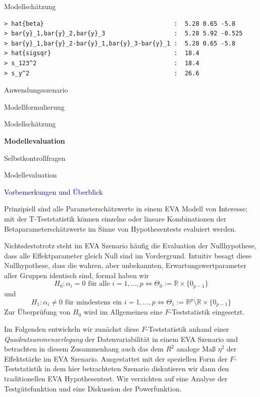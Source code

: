 \documentclass[
  8pt,
  ignorenonframetext,
]{beamer}
\begin{document}
\begin{frame}[fragile]{Modellschätzung}
\begin{verbatim}
> hat{beta}                                    :  5.28 0.65 -5.8 
> bar{y}_1,bar{y}_2,bar{y}_3                   :  5.28 5.92 -0.525 
> bar{y}_1,bar{y}_2-bar{y}_1,bar{y}_3-bar{y}_1 :  5.28 0.65 -5.8 
> hat{sigsqr}                                  :  18.4 
> s_123^2                                      :  18.4 
> s_y^2                                        :  26.6
\end{verbatim}
\end{frame}

\begin{frame}{}
\protect\hypertarget{section-6}{}
\large
{}
\vfill

Anwendungsszenario

Modellformulierung

Modellschätzung

\textbf{Modellevaluation}

Selbstkontrollfragen \vfill
\end{frame}

\begin{frame}{Modellevaluation}
\protect\hypertarget{modellevaluation}{}
\small

\textcolor{darkblue}{Vorbemerkungen und Überblick}

\footnotesize

Prinzipiell sind alle Parameterschätzwerte in einem EVA Modell von
Interesse; mit der T-Teststatistik können einzelne oder lineare
Kombinationen der Betaparameterschätzwerte im Sinne von Hypothesentests
evaluiert werden.

Nichtsdestotrotz steht im EVA Szenario häufig die Evaluation der
Nullhypothese, dass alle Effektparameter gleich Null sind im
Vordergrund. Intuitiv besagt diese Nullhypothese, dass die wahren, aber
unbekannten, Erwartungswertparameter aller Gruppen identisch sind,
formal haben wir \begin{equation}
H_0 : \alpha_i = 0 \mbox{ für alle } i = 1,...,p \Leftrightarrow \Theta_0 := \mathbb{R} \times \{0_{p-1}\}
\end{equation} und \begin{equation}
H_1 : \alpha_i \neq 0 \mbox{ für mindestens ein } i = 1,...,p \Leftrightarrow \Theta_1 := \mathbb{R}^p \setminus \mathbb{R} \times \{0_{p-1}\}
\end{equation} Zur Überprüfung von \(H_0\) wird im Allgemeinen eine
\(F\)-Teststatistik eingesetzt.

Im Folgenden entwickeln wir zunächst diese \(F\)-Teststatistik anhand
einer \emph{Quadratsummenzerlegung} der Datenvariabilität in einem EVA
Szenario und betrachten in diesem Zusammenhang auch das dem \(R^2\)
analoge Maß \(\eta^2\) der Effektstärke im EVA Szenario. Ausgestattet
mit der speziellen Form der \(F\)-Teststatistik in dem hier betrachteten
Szenario diskutieren wir dann den traditionellen EVA Hypothesentest. Wir
verzichten auf eine Analyse der Testgütefunktion und eine Diskussion der
Powerfunktion.
\end{frame}
\end{document}
